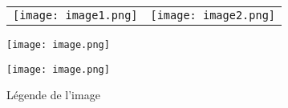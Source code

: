 \usepackage{float} %

\usepackage{graphicx}
\graphicspath{{images/}}

\usepackage{caption}


\begin{figure}[H]
    \centering
    \begin{tabular}{cc}
    \texttt{[image: image1.png]} \hspace{0.3cm} & \hspace{0.3cm} \texttt{[image: image2.png]}
    \end{tabular}
\end{figure}

\begin{figure}[H]
    \centering
    \texttt{[image: image.png]}
\end{figure}

\begin{figure}[H]
    \centering
    \texttt{[image: image.png]}
    \caption{Légende de l'image}
\end{figure}

